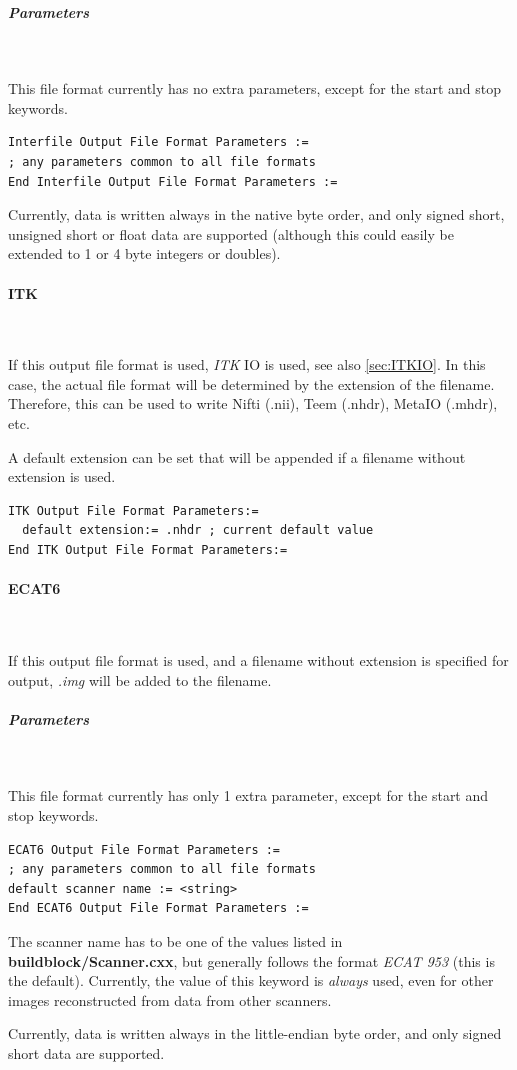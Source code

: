 \documentclass{article}
\newcommand{\subsubsubsection}[1]{\paragraph{#1}\mbox{} \\}
\newcommand{\subsubsubsubsection}[1]{\subparagraph{#1} \mbox{} \\}
\begin{document}
{{{ \subsubsubsubsection{Parameters}
}
This file format currently has no extra parameters, except for 
the start and stop keywords.

\begin{verbatim}
Interfile Output File Format Parameters :=
; any parameters common to all file formats
End Interfile Output File Format Parameters :=
\end{verbatim}

Currently, data is written always in the native byte order, and 
only signed short, unsigned short or float data are supported 
(although this could easily be extended to 1 or 4 byte integers 
or doubles).

{ \subsubsubsection{ITK}
}
If this output file format is used, \textit{ITK} IO is used, see also \ref{sec:ITKIO}. 
In this case, the actual file format will be determined by the extension of the filename.
Therefore, this can be used to write Nifti (.nii), Teem (.nhdr),
MetaIO (.mhdr), etc.

A default extension can be set that will be  appended if a filename without extension is used.

\begin{verbatim}
ITK Output File Format Parameters:=
  default extension:= .nhdr ; current default value
End ITK Output File Format Parameters:=
\end{verbatim}

{ \subsubsubsection{ECAT6}
}
If this output file format is used, and a filename without extension 
is specified for output, \textit{.img} will be added to the filename.

{ \subsubsubsubsection{Parameters}
}
This file format currently has only 1 extra parameter, except 
for the start and stop keywords.

\begin{verbatim}
ECAT6 Output File Format Parameters :=
; any parameters common to all file formats
default scanner name := <string>
End ECAT6 Output File Format Parameters :=
\end{verbatim}

The scanner name has to be one of the values listed in \textbf{buildblock/Scanner.cxx}, 
but generally follows the format \textit{ECAT 953} (this is the default). 
Currently, the value of this keyword is \textit{always} used, even 
for other images reconstructed from data from other scanners.

Currently, data is written always in the little-endian byte order, 
and only signed short data are supported.

}}
\end{document}
